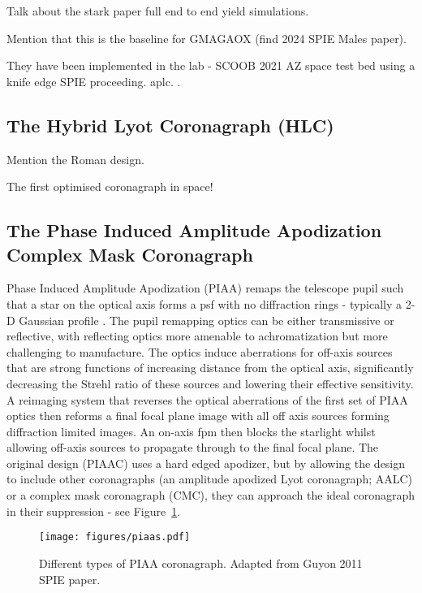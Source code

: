 \documentclass[letterpaper]{ar-1col}
\begin{document}
Talk about the stark paper \citep{Stark24} full end to end yield simulations.

Mention that this is the baseline for GMAGAOX (find 2024 SPIE Males paper).

They have been implemented in the lab - SCOOB 2021 AZ space test bed \citep{Ashcraft22} using a knife edge SPIE proceeding. \ac{aplc}. \citep{vanGorkom22}.

\subsection{The Hybrid Lyot Coronagraph (HLC)}

Mention the Roman design.

The first optimised coronagraph in space!


\subsection{The Phase Induced Amplitude Apodization Complex Mask Coronagraph}

Phase Induced Amplitude Apodization (PIAA) remaps the telescope pupil such that a star on the optical axis forms a \ac{psf} with no diffraction rings - typically a 2-D Gaussian profile \citep{Guyon03,Guyon05,Guyon14}.
%
The pupil remapping optics can be either transmissive or reflective, with reflecting optics more amenable to achromatization but more challenging to manufacture.
%
The optics induce aberrations for off-axis sources that are strong functions of increasing distance from the optical axis, significantly decreasing the Strehl ratio of these sources and lowering their effective sensitivity.
%
A reimaging system that reverses the optical aberrations of the first set of PIAA optics then reforms a final focal plane image with all off axis sources forming diffraction limited images.
%
An on-axis \ac{fpm} then blocks the starlight whilst allowing off-axis sources to propagate through to the final focal plane.
%
The original design (PIAAC) uses a hard edged apodizer, but by allowing the design to include other coronagraphs (an amplitude apodized Lyot coronagraph; AALC) or a complex mask coronagraph (CMC), they can approach the ideal coronagraph in their suppression - see Figure~\ref{fig:piaatypes}.

\begin{figure}[ht]
  \centering
  \texttt{[image: figures/piaas.pdf]}
  \caption{Different types of PIAA coronagraph. Adapted from Guyon 2011 SPIE paper.}
  \label{fig:piaatypes}
\end{figure}
\end{document}
